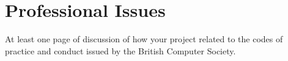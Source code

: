\chapter{Professional Issues}
\label{ch:professional-issues}

At least one page of discussion of how your project related to the codes of
practice and conduct issued by the British Computer Society.